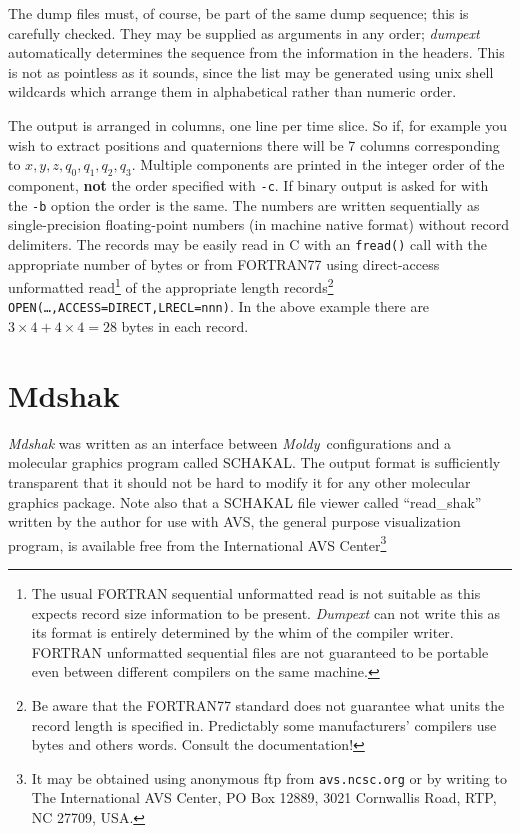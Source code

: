 \documentclass[twoside]{report}
\newcommand{\moldy}{{\em Moldy}}
\begin{document}
The dump files must, of course, be part of the same dump sequence;
this is carefully checked.  They may be supplied as arguments in any
order; {\em dumpext\/} automatically determines the sequence from
the information in the headers.  This is not as pointless as it sounds,
since the list may be generated using unix shell wildcards which arrange
them in alphabetical rather than numeric order.

The output is arranged in columns, one line per time slice.  So if,
for example you wish to extract positions and quaternions there will
be 7 columns corresponding to $x,y,z,q_0,q_1,q_2,q_3$. Multiple
components are printed in the integer order of the component, {\bf
not} the order specified with \texttt{-c}. If binary output is asked for
with the \texttt{-b} option the order is the same. The numbers are
written sequentially as single-precision floating-point numbers (in
machine native format) without record delimiters.  The records may be
easily read in C with an
\texttt{fread()} call with the appropriate number of bytes or from
FORTRAN77 using direct-access unformatted read\footnote{The usual
FORTRAN sequential unformatted read is not suitable as this expects
record size information to be present.  {\em Dumpext\/} can not
write this as its format is entirely determined by the whim of the
compiler writer.  FORTRAN unformatted sequential files are not
guaranteed to be portable even between different compilers on the same
machine.} of the appropriate length records\footnote{Be aware that the
FORTRAN77 standard does not guarantee what units the record length is
specified in.  Predictably some manufacturers' compilers use bytes and
others words.  Consult the documentation!}
\texttt{OPEN(\ldots,ACCESS=DIRECT,LRECL=nnn)}.  In the above example there are
$3 \times 4 + 4 \times 4 = 28$ bytes in each record.
\section{Mdshak}%
{\em Mdshak\/} was written as an interface between \moldy\ configurations
and a molecular graphics program called SCHAKAL\cite{schakal:88}.  The
output format is sufficiently transparent that it should not be hard
to modify it for any other molecular graphics package.  Note also that
a SCHAKAL file viewer called ``read\_shak'' written by the author for
use with AVS, the general purpose visualization program, is available
free from the International AVS Center\footnote{It may be obtained
using anonymous ftp from \texttt{avs.ncsc.org} or by writing to The
International AVS Center, PO Box 12889, 3021 Cornwallis Road, RTP, NC
27709, USA.}
\end{document}
